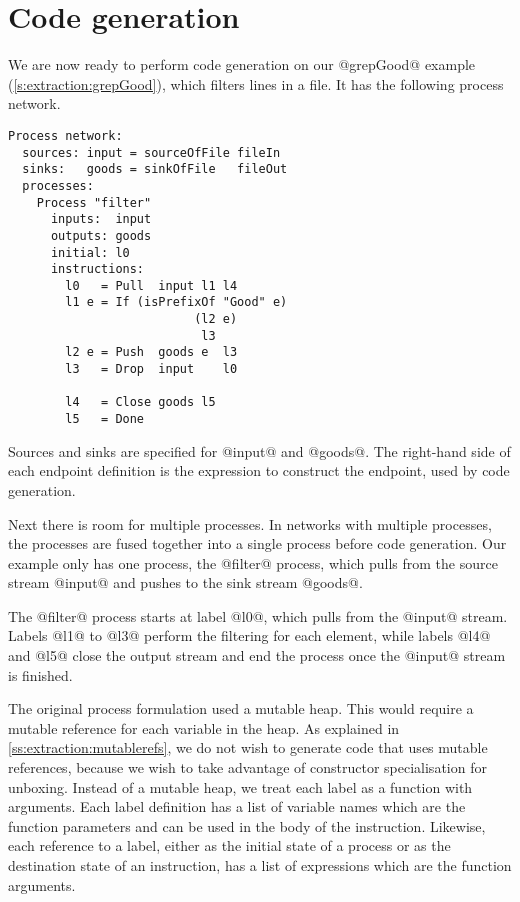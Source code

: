 \section{Code generation}
We are now ready to perform code generation on our @grepGood@ example (\autoref{s:extraction:grepGood}), which filters lines in a file.
It has the following process network.

\begin{lstlisting}
Process network:
  sources: input = sourceOfFile fileIn
  sinks:   goods = sinkOfFile   fileOut
  processes:
    Process "filter"
      inputs:  input
      outputs: goods
      initial: l0
      instructions:
        l0   = Pull  input l1 l4
        l1 e = If (isPrefixOf "Good" e)
                          (l2 e)
                           l3
        l2 e = Push  goods e  l3
        l3   = Drop  input    l0

        l4   = Close goods l5
        l5   = Done
\end{lstlisting}

Sources and sinks are specified for @input@ and @goods@.
The right-hand side of each endpoint definition is the expression to construct the endpoint, used by code generation.

Next there is room for multiple processes.
In networks with multiple processes, the processes are fused together into a single process before code generation.
Our example only has one process, the @filter@ process, which pulls from the source stream @input@ and pushes to the sink stream @goods@.

The @filter@ process starts at label @l0@, which pulls from the @input@ stream.
Labels @l1@ to @l3@ perform the filtering for each element, while labels @l4@ and @l5@ close the output stream and end the process once the @input@ stream is finished.

The original process formulation  used a mutable heap.
This would require a mutable reference for each variable in the heap.
As explained in \autoref{ss:extraction:mutablerefs}, we do not wish to generate code that uses mutable references, because we wish to take advantage of constructor specialisation for unboxing.
Instead of a mutable heap, we treat each label as a function with arguments.
Each label definition has a list of variable names which are the function parameters and can be used in the body of the instruction.
Likewise, each reference to a label, either as the initial state of a process or as the destination state of an instruction, has a list of expressions which are the function arguments.

